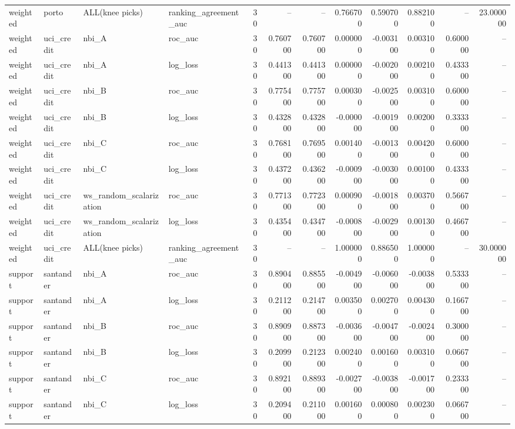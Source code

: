 \begin{landscape}
\begin{longtable}{llllrrrrrrrr}
weighted & porto & ALL(knee picks) & ranking\_agreement\_auc & 30 & -- & -- & 0.766700 & 0.590700 & 0.882100 & -- & 23.000000 \\
weighted & uci\_credit & nbi\_A & roc\_auc & 30 & 0.760700 & 0.760700 & 0.000000 & -0.003100 & 0.003100 & 0.600000 & -- \\
weighted & uci\_credit & nbi\_A & log\_loss & 30 & 0.441300 & 0.441300 & 0.000000 & -0.002000 & 0.002100 & 0.433300 & -- \\
weighted & uci\_credit & nbi\_B & roc\_auc & 30 & 0.775400 & 0.775700 & 0.000300 & -0.002500 & 0.003100 & 0.600000 & -- \\
weighted & uci\_credit & nbi\_B & log\_loss & 30 & 0.432800 & 0.432800 & -0.000000 & -0.001900 & 0.002000 & 0.333300 & -- \\
weighted & uci\_credit & nbi\_C & roc\_auc & 30 & 0.768100 & 0.769500 & 0.001400 & -0.001300 & 0.004200 & 0.600000 & -- \\
weighted & uci\_credit & nbi\_C & log\_loss & 30 & 0.437200 & 0.436200 & -0.000900 & -0.003000 & 0.001000 & 0.433300 & -- \\
weighted & uci\_credit & ws\_random\_scalarization & roc\_auc & 30 & 0.771300 & 0.772300 & 0.000900 & -0.001800 & 0.003700 & 0.566700 & -- \\
weighted & uci\_credit & ws\_random\_scalarization & log\_loss & 30 & 0.435400 & 0.434700 & -0.000800 & -0.002900 & 0.001300 & 0.466700 & -- \\
weighted & uci\_credit & ALL(knee picks) & ranking\_agreement\_auc & 30 & -- & -- & 1.000000 & 0.886500 & 1.000000 & -- & 30.000000 \\
support & santander & nbi\_A & roc\_auc & 30 & 0.890400 & 0.885500 & -0.004900 & -0.006000 & -0.003800 & 0.533300 & -- \\
support & santander & nbi\_A & log\_loss & 30 & 0.211200 & 0.214700 & 0.003500 & 0.002700 & 0.004300 & 0.166700 & -- \\
support & santander & nbi\_B & roc\_auc & 30 & 0.890900 & 0.887300 & -0.003600 & -0.004700 & -0.002400 & 0.300000 & -- \\
support & santander & nbi\_B & log\_loss & 30 & 0.209900 & 0.212300 & 0.002400 & 0.001600 & 0.003100 & 0.066700 & -- \\
support & santander & nbi\_C & roc\_auc & 30 & 0.892100 & 0.889300 & -0.002700 & -0.003800 & -0.001700 & 0.233300 & -- \\
support & santander & nbi\_C & log\_loss & 30 & 0.209400 & 0.211000 & 0.001600 & 0.000800 & 0.002300 & 0.066700 & -- \\

\end{longtable}
\end{landscape}
